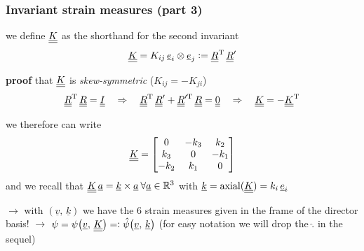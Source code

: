 \begin{frame}
  \frametitle{Invariant strain measures (part 3)}
  
  we define $\underline{\underline{K}}$ as the shorthand for the second invariant
  \begin{displaymath}
    \underline{\underline{K}} =
    K_{ij} \, \underline{e}_i \otimes \underline{e}_j :=
    \underline{\underline{R}}^{\mathrm{T}} \, \underline{\underline{R}}^{\prime}
  \end{displaymath}
  
  \vspace{0.5em}
  \textbf{proof} that $\underline{\underline{K}}$ is \textit{skew-symmetric} ($K_{ij} = -K_{ji}$)
  \begin{displaymath}
    \underline{\underline{R}}^{\mathrm{T}} \, \underline{\underline{R}} = \underline{\underline{I}}
    \quad \Rightarrow \quad
    \underline{\underline{R}}^{\mathrm{T}} \, \underline{\underline{R}}^{\prime} + \underline{\underline{R}}^{\prime \mathrm{T}} \, \underline{\underline{R}} = \underline{\underline{0}}
    \quad \Rightarrow \quad
    \underline{\underline{K}} = -\underline{\underline{K}}^{\mathrm{T}}
  \end{displaymath}
  
  \vspace{0.5em}
  we therefore can write
  \begin{displaymath}
    \underline{\underline{K}} = 
    \begin{bmatrix}
       0   & -k_3 &  k_2 \\
       k_3 &  0   & -k_1 \\
      -k_2 &  k_1 &  0
    \end{bmatrix}
  \end{displaymath}
  \vspace{0.5em}
  and we recall that $\underline{\underline{K}} \, \underline{a} = \underline{k} \times \underline{a} \: \forall \underline{a} \in \mathbb{R}^3$ with $\underline{k} = \mathrm{axial}(\underline{\underline{K}}) = k_i \, \underline{e}_i$
  
  \vspace{1em}
  $\rightarrow$ with $\left( \underline{v} , \, \underline{k} \right)$ we have the 6 strain measures given in the frame of the director basis! \newline
  $\rightarrow$ $\psi = \psi \bigl( \underline{v} , \, \underline{\underline{K}} \bigr) =: \hat{\psi} \bigl( \underline{v} , \, \underline{k} \bigr)$ (for easy notation we will drop the $\hat{.}$ in the sequel)
\end{frame}


